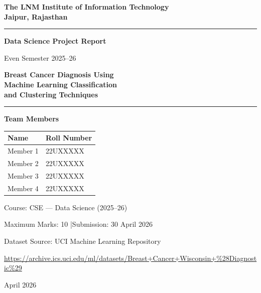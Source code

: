 \documentclass[12pt,a4paper]{article}
\begin{document}
\begin{titlepage}
  \pagecolor{lnmblue}
  \color{white}
  \centering
  \vspace*{1.5cm}

  {\Huge\bfseries The LNM Institute of Information Technology\\[6pt]
  Jaipur, Rajasthan\par}

  \vspace{0.6cm}
  \rule{0.7\linewidth}{0.8pt}

  \vspace{0.8cm}
  {\LARGE\bfseries Data Science Project Report\par}
  \vspace{0.4cm}
  {\Large Even Semester 2025--26\par}

  \vspace{1.2cm}
  \begin{minipage}{0.85\linewidth}
    \centering
    {\huge\bfseries Breast Cancer Diagnosis Using\\[4pt]
    Machine Learning Classification\\[4pt]
    and Clustering Techniques\par}
  \end{minipage}

  \vspace{1.4cm}
  \rule{0.7\linewidth}{0.5pt}
  \vspace{0.8cm}

  {\large\bfseries Team Members\par}
  \vspace{0.4cm}

  \begin{tabular}{ll}
    \toprule
    \textbf{Name} & \textbf{Roll Number} \\
    \midrule
    Member 1 & 22UXXXXX \\
    Member 2 & 22UXXXXX \\
    Member 3 & 22UXXXXX \\
    Member 4 & 22UXXXXX \\
    \bottomrule
  \end{tabular}

  \vspace{1.2cm}
  {\large Course: CSE --- Data Science (2025--26)\par}
  {\large Maximum Marks: 10 \quad|\quad Submission: 30 April 2026\par}

  \vspace{1cm}
  {\normalsize Dataset Source: UCI Machine Learning Repository\par}
  {\normalsize \url{https://archive.ics.uci.edu/ml/datasets/Breast+Cancer+Wisconsin+\%28Diagnostic\%29}\par}

  \vfill
  {\small April 2026}
\end{titlepage}
\end{document}
